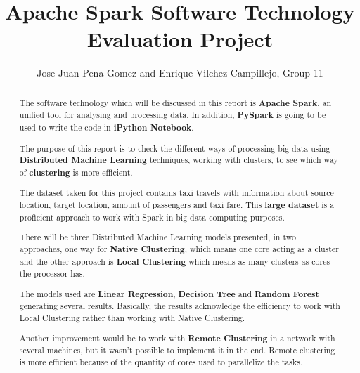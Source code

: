 \documentclass[11pt]{article}
\begin{document}
\title{Apache Spark Software Technology Evaluation Project}

\author{Jose Juan Pena Gomez and Enrique Vilchez Campillejo,
Group 11}

\maketitle

\begin{abstract}

The software technology which will be discussed in this report is \textbf{Apache Spark}, an unified tool for analysing and processing data. In addition, \textbf{PySpark} is going to be used to write the code in \textbf{iPython Notebook}.

The purpose of this report is to check the different ways of processing big data using \textbf{Distributed Machine Learning} techniques, working with clusters, to see which way of \textbf{clustering} is more efficient.

The dataset taken for this project contains taxi travels with information about source location, target location, amount of passengers and taxi fare. This \textbf{large dataset} is a proficient approach to work with Spark in big data computing purposes.

There will be three Distributed Machine Learning models presented, in two approaches, one way for \textbf{Native Clustering}, which means one core acting as a cluster and the other approach is \textbf{Local Clustering} which means as many clusters as cores the processor has.

The models used are \textbf{Linear Regression}, \textbf{Decision Tree} and \textbf{Random Forest} generating several results. Basically, the results acknowledge the efficiency to work with Local Clustering rather than working with Native Clustering. 

Another improvement would be to work with \textbf{Remote Clustering} in a network with several machines, but it wasn't possible to implement it in the end. Remote clustering is more efficient because of the quantity of cores used to parallelize the tasks.

  
\end{abstract}

%












{}
\end{document}
